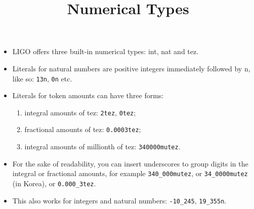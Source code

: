 \documentclass[wide]{slides}
\begin{document}
\begin{slide}
  \title{Numerical Types}

  \begin{itemize}

    \item LIGO offers three built-in numerical types: \textsf{int},
      \textsf{nat} and \textsf{tez}.

    \item Literals for natural numbers are positive integers
      immediately followed by \textsf{n}, like so: \texttt{13n},
      \texttt{0n} etc.

    \item Literals for token amounts can have three forms:
      \begin{enumerate}

        \item integral amounts of tez: \texttt{2tez}, \texttt{0tez};

        \item fractional amounts of tez: \texttt{0.0003tez};

        \item integral amounts of millionth of tez:
          \texttt{340000mutez}.

      \end{enumerate}

    \item For the sake of readability, you can insert underscores to
      group digits in the integral or fractional amounts, for example
      \texttt{340\_000mutez}, or \texttt{34\_0000mutez} (in Korea), or
      \texttt{0.000\_3tez}.

    \item This also works for integers and natural numbers:
      \texttt{-10\_245}, \texttt{19\_355n}.

  \end{itemize}

\end{slide}
\end{document}
